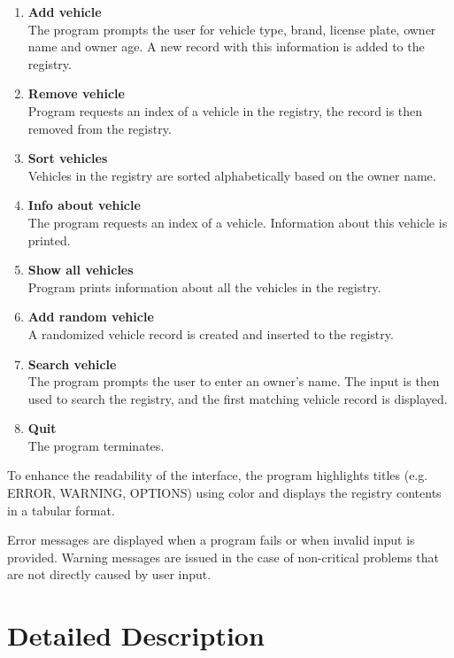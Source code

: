 \documentclass[12pt, a4paper]{article}
\begin{document}
\begin{enumerate}
  \item \textbf{Add vehicle} \\
  The program prompts the user for vehicle type, brand, license plate, owner name and owner age. A new record with this information is added to the registry.

  \item \textbf{Remove vehicle} \\
  Program requests an index of a vehicle in the registry, the record is then removed from the registry.

  \item \textbf{Sort vehicles} \\
  Vehicles in the registry are sorted alphabetically based on the owner name.

  \item \textbf{Info about vehicle} \\
  The program requests an index of a vehicle. Information about this vehicle is printed.

  \item \textbf{Show all vehicles} \\
  Program prints information about all the vehicles in the registry.

  \item \textbf{Add random vehicle} \\
  A randomized vehicle record is created and inserted to the registry.

  \item \textbf{Search vehicle} \\
    The program prompts the user to enter an owner's name. The input is then used to search the registry, and the first matching vehicle record is displayed.

  \item \textbf{Quit} \\
  The program terminates.
\end{enumerate}

To enhance the readability of the interface, the program highlights titles (e.g. ERROR, WARNING, OPTIONS) using color and displays the registry contents in a tabular format. 

Error messages are displayed when a program fails or when invalid input is provided. Warning messages are issued in the case of non-critical problems that are not directly caused by user input.

\section{Detailed Description}
\end{document}
